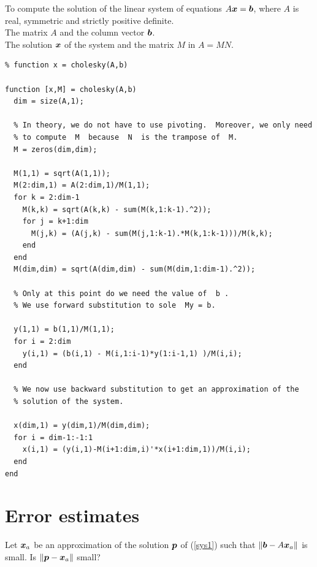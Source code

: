 \begin{code}
To compute the solution of the linear system of equations
$A\bm{x} = \bm{b}$, where $A$ is real, symmetric and strictly
positive definite.\\
 The matrix $A$ and the column vector $\bm{b}$.\\
 The solution $\bm{x}$ of the system and the matrix $M$
in $A = M N$.
\small
\begin{verbatim}
% function x = cholesky(A,b)

function [x,M] = cholesky(A,b)
  dim = size(A,1);

  % In theory, we do not have to use pivoting.  Moreover, we only need
  % to compute  M  because  N  is the trampose of  M.
  M = zeros(dim,dim);
  
  M(1,1) = sqrt(A(1,1));
  M(2:dim,1) = A(2:dim,1)/M(1,1);
  for k = 2:dim-1
    M(k,k) = sqrt(A(k,k) - sum(M(k,1:k-1).^2));
    for j = k+1:dim
      M(j,k) = (A(j,k) - sum(M(j,1:k-1).*M(k,1:k-1)))/M(k,k);
    end
  end
  M(dim,dim) = sqrt(A(dim,dim) - sum(M(dim,1:dim-1).^2));

  % Only at this point do we need the value of  b .
  % We use forward substitution to sole  My = b.

  y(1,1) = b(1,1)/M(1,1);
  for i = 2:dim
    y(i,1) = (b(i,1) - M(i,1:i-1)*y(1:i-1,1) )/M(i,i);
  end

  % We now use backward substitution to get an approximation of the
  % solution of the system.

  x(dim,1) = y(dim,1)/M(dim,dim);
  for i = dim-1:-1:1
    x(i,1) = (y(i,1)-M(i+1:dim,i)'*x(i+1:dim,1))/M(i,i);
  end
end
\end{verbatim}
\end{code}

\section{Error estimates}\label{ErrorEstAxb}

Let $\bm{x}_a$ be an approximation of the solution $\bm{p}$ of
(\ref{sys1}) such that $\|\bm{b} - A\bm{x}_a\|$ is small.  Is
$\|\bm{p} - \bm{x}_a\|$ small?

